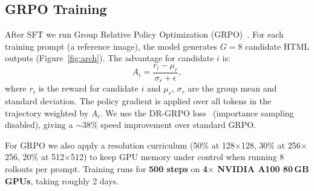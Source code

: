 \documentclass[10pt,twocolumn,letterpaper]{article}
\begin{document}
\subsection{GRPO Training}

After SFT we run Group Relative Policy Optimization
(GRPO)~\citep{shao2024deepseekmath}.  For each training prompt (a reference
image), the model generates $G = 8$ candidate HTML outputs (Figure~\ref{fig:arch}).  The advantage for
candidate $i$ is:
\[
  A_i = \frac{r_i - \mu_r}{\sigma_r + \epsilon},
\]
where $r_i$ is the reward for candidate $i$ and $\mu_r$, $\sigma_r$ are the
group mean and standard deviation.  The policy gradient is applied over all
tokens in the trajectory weighted by $A_i$.  We use the DR-GRPO loss~\citep{vonwerra2022trl}
(importance sampling disabled), giving a $\sim$38\% speed improvement
over standard GRPO.

For GRPO we also apply a resolution curriculum (50\% at 128$\times$128,
30\% at 256$\times$256, 20\% at 512$\times$512) to keep GPU memory under
control when running 8 rollouts per prompt.  Training runs for \textbf{500 steps}
on \textbf{4$\times$ NVIDIA A100 80\,GB GPUs}, taking roughly 2 days.
\end{document}
